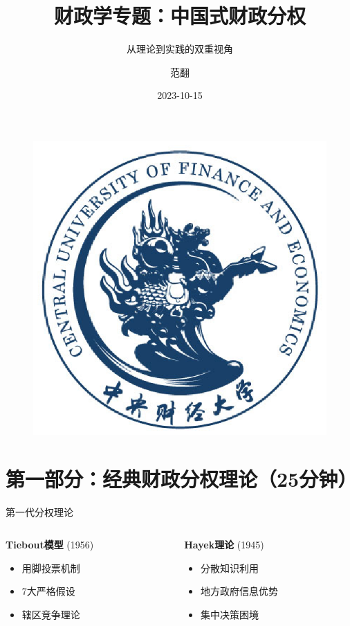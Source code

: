 \documentclass{beamer}
\title{财政学专题：中国式财政分权}
\subtitle{从理论到实践的双重视角}
\author{范翻}
\institute{中央财经大学财政学院}
\date{2023-10-15}
\begin{document}
\kaishu  %
\begin{frame}
  \titlepage
  \begin{figure}[htpb]
    \centering
    \includegraphics[width=0.2\linewidth]{pic/cufe_logo_blue.eps}
  \end{figure}
\end{frame}



\section{第一部分：经典财政分权理论（25分钟）}\label{ux7b2cux4e00ux90e8ux5206ux7ecfux5178ux8d22ux653fux5206ux6743ux7406ux8bba25ux5206ux949f}

\begin{frame}{第一代分权理论}
\label{ux7b2cux4e00ux4ee3ux5206ux6743ux7406ux8bba}
\vspace{-2mm}

\begin{columns}[T]
\begin{column}{0.48\textwidth}
  \textbf{Tiebout模型} (1956)
  \begin{itemize}\footnotesize
    \item 用脚投票机制
    \item 7大严格假设
    \item 辖区竞争理论
  \end{itemize}
\end{column}
\begin{column}{0.48\textwidth}
  \textbf{Hayek理论} (1945)
  \begin{itemize}\footnotesize
    \item 分散知识利用
    \item 地方政府信息优势
    \item 集中决策困境
  \end{itemize}
\end{column}
\end{columns}
\end{frame}
\end{document}
